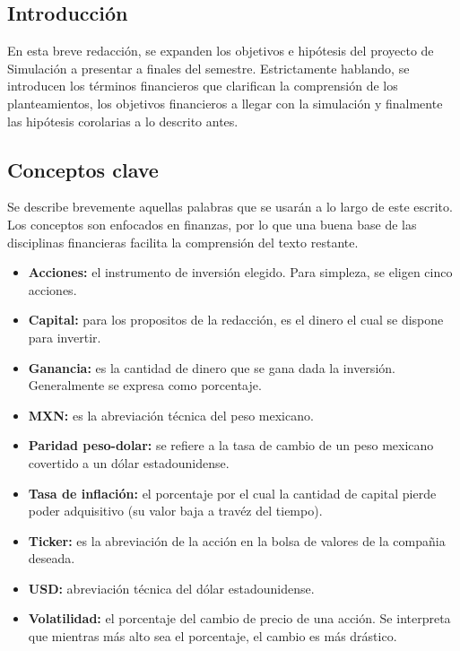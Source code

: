 \documentclass[letterpaper, 12pt]{article}
\begin{document}
    \newpage
    \begin{justify}
        \setcounter{page}{1}
        \thispagestyle{fancy}
        \section*{Introducción}
        \justify
        En esta breve redacción, se expanden los objetivos e hipótesis del proyecto de Simulación a presentar a finales del semestre. Estrictamente hablando, se introducen
        los términos financieros que clarifican la comprensión de los planteamientos, los objetivos financieros a llegar con la simulación y finalmente las hipótesis corolarias
        a lo descrito antes.
        \subsection*{Conceptos clave}
        \justify
        Se describe brevemente aquellas palabras que se usarán a lo largo de este escrito. Los conceptos son enfocados en finanzas, por lo que una buena base de las disciplinas financieras
        facilita la comprensión del texto restante.
        \begin{itemize}
            \item \textbf{Acciones:} el instrumento de inversión elegido. Para simpleza, se eligen cinco acciones.
            \item \textbf{Capital:} para los propositos de la redacción, es el dinero el cual se dispone para invertir.
            \item \textbf{Ganancia:} es la cantidad de dinero que se gana dada la inversión. Generalmente se expresa como porcentaje.
            \item \textbf{MXN:} es la abreviación técnica del peso mexicano.
            \item \textbf{Paridad peso-dolar:} se refiere a la tasa de cambio de un peso mexicano covertido a un dólar estadounidense.
            \item \textbf{Tasa de inflación:} el porcentaje por el cual la cantidad de capital pierde poder adquisitivo (su valor baja a travéz del tiempo).
            \item \textbf{Ticker:} es la abreviación de la acción en la bolsa de valores de la compañia deseada.
            \item \textbf{USD:} abreviación técnica del dólar estadounidense.
            \item \textbf{Volatilidad:} el porcentaje del cambio de precio de una acción. Se interpreta que mientras más alto sea el porcentaje, el cambio es más drástico.
        \end{itemize}

\end{justify}
\end{document}
